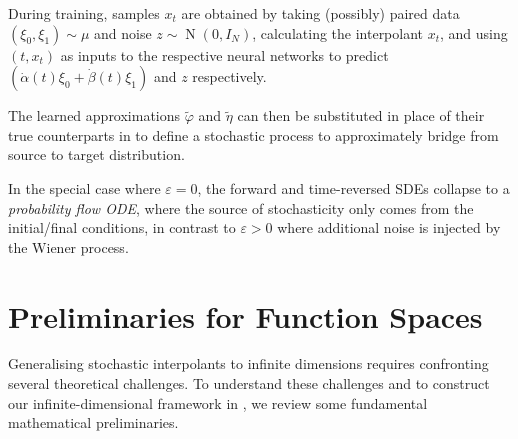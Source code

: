 During training, samples \(x_{t}\) are obtained by taking (possibly) paired data \((\xi_{0}, \xi_{1}) \sim \mu\) and noise \(z \sim \operatorname{N}(0, I_{N})\), calculating the interpolant \(x_{t}\), and using \((t, x_{t})\) as inputs to the respective neural networks to predict \((\dot{\alpha}(t) \xi_{0} + \dot{\beta}(t) \xi_{1})\) and \(z\) respectively.

The learned approximations \(\widetilde{\varphi}\) and \(\widetilde{\eta}\) can then be substituted in place of their true counterparts in  to define a stochastic process to approximately bridge from source to target distribution.

In the special case where \(\varepsilon = 0\), the forward and time-reversed SDEs collapse to a \textit{probability flow ODE}, where the source of stochasticity only comes from the initial/final conditions, in contrast to \(\varepsilon > 0\) where additional noise is injected by the Wiener process. %





\section{Preliminaries for Function Spaces}
Generalising stochastic interpolants to infinite dimensions requires confronting several theoretical challenges. To understand these challenges and to construct our infinite-dimensional framework in , we review some fundamental mathematical preliminaries.

